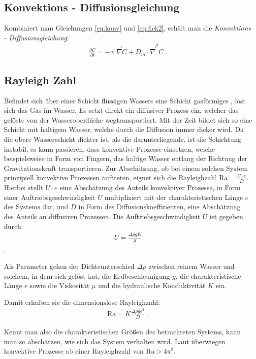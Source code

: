 \subsection{Konvektions - Diffusionsgleichung}
\label{sec:dispkon}
Kombiniert man Gleichungen \ref{eq:konv} und \ref{eq:fick2}, erhält man die \textit{Konvektions - Diffusionsgleichung}:
\begin{align}
 \frac{\partial C}{\partial t} = -\vec{v} \, \vec{\nabla}C + D_m \cdot \vec{\nabla}^2 C \; .
\end{align}


\subsection{Rayleigh Zahl}
\label{sec:ray}

Befindet sich über einer Schicht flüssigen Wassers eine Schicht gasförmiges \COT, löst sich das Gas im Wasser. Es setzt direkt ein diffusiver Prozess ein, welcher das gelöste \COT von der Wasseroberfläche wegtransportiert. Mit der Zeit bildet sich so eine Schicht mit \COTm haltigem Wasser, welche durch die Diffusion immer dicker wird. Da die obere Wasserschicht dichter ist, als die darunterliegende, ist die Schichtung instabil, es kann passieren, dass konvektive Prozesse einsetzen, welche beispielsweise in Form von Fingern, das \COTm haltige Wasser entlang der Richtung der Gravitationskraft transportieren.
Zur Abschätzung, ob bei einem solchen System prinzipiell konvektive Prozessen auftreten, eignet sich die Rayleighzahl $\mathrm{Ra} = \frac{U \cdot e}{D}$. Hierbei stellt $U \cdot e$ eine Abschätzung des Anteils konvektiver Prozesse, in Form einer Auftriebsgeschwindigkeit $U$ multipliziert mit der charakteristischen Länge $e$ des Systems dar, und $D$ in Form des Diffusionskoeffizienten, eine Abschätzung des Anteils an diffusiven Prozessen. 
Die Auftriebsgeschwindigkeit $U$ ist gegeben durch:
\begin{align}
 U = \frac{\Delta\rho g K}{\mu}
 \label{eq:U}
\end{align}
\citep{fernandez}.

Als Parameter gehen der Dichteunterschied $\Delta\rho$ zwischen reinem Wasser und solchem, in dem sich \COT gelöst hat, die Erdbeschleunigung $g$, die charakteristische Länge $e$ sowie die Viskosität $\mu$ und die hydraulische Konduktivität $K$ ein.

Damit erhalten sie die dimensionslose Rayleighzahl:
\begin{align}
 \mathrm{Ra} = K\frac{\Delta\rho g e^2}{D} \; .
 \label{eq:Ra}
\end{align}

Kennt man also die charakteristischen Größen des betrachteten Systems, kann man so abschätzen, wie sich das System verhalten wird. Laut \cite{kneafsy} überwiegen konvektive Prozesse ab einer Rayleighzahl von \mbox{$\mathrm{Ra} > 4\pi^2$}.
